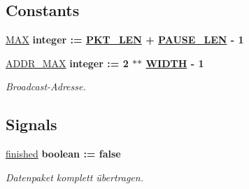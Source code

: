 \subsection*{Constants}
 \begin{DoxyCompactItemize}
\item 
\mbox{\hyperlink{classswitch_1_1switch_a138ff3d13d23e477480ce8fb57e9eab2}{M\+AX}} {\bfseries \textcolor{comment}{integer}\textcolor{vhdlchar}{ }\textcolor{vhdlchar}{ }\textcolor{vhdlchar}{\+:}\textcolor{vhdlchar}{=}\textcolor{vhdlchar}{ }\textcolor{vhdlchar}{ }\textcolor{vhdlchar}{ }\textcolor{vhdlchar}{ }{\bfseries \mbox{\hyperlink{classswitch_a9471bdd4db653e9a1f455d5147a685c2}{P\+K\+T\+\_\+\+L\+EN}}} \textcolor{vhdlchar}{+}\textcolor{vhdlchar}{ }\textcolor{vhdlchar}{ }\textcolor{vhdlchar}{ }{\bfseries \mbox{\hyperlink{classswitch_afc0c5f511c854ac6822209338935e527}{P\+A\+U\+S\+E\+\_\+\+L\+EN}}} \textcolor{vhdlchar}{-\/}\textcolor{vhdlchar}{ } \textcolor{vhdldigit}{1} \textcolor{vhdlchar}{ }} 
\item 
\mbox{\label{classswitch_1_1switch_a431fa12d262243a7ee6a374e578e9936}} 
\mbox{\hyperlink{classswitch_1_1switch_a431fa12d262243a7ee6a374e578e9936}{A\+D\+D\+R\+\_\+\+M\+AX}} {\bfseries \textcolor{comment}{integer}\textcolor{vhdlchar}{ }\textcolor{vhdlchar}{ }\textcolor{vhdlchar}{\+:}\textcolor{vhdlchar}{=}\textcolor{vhdlchar}{ }\textcolor{vhdlchar}{ } \textcolor{vhdldigit}{2} \textcolor{vhdlchar}{$\ast$}\textcolor{vhdlchar}{$\ast$}\textcolor{vhdlchar}{ }\textcolor{vhdlchar}{ }\textcolor{vhdlchar}{ }{\bfseries \mbox{\hyperlink{classswitch_ac3d29a0b6e2054c99b41ad85df850fa1}{W\+I\+D\+TH}}} \textcolor{vhdlchar}{-\/}\textcolor{vhdlchar}{ } \textcolor{vhdldigit}{1} \textcolor{vhdlchar}{ }} 
\begin{DoxyCompactList}\small\item\em Broadcast-\/\+Adresse. \end{DoxyCompactList}\end{DoxyCompactItemize}
\subsection*{Signals}
 \begin{DoxyCompactItemize}
\item 
\mbox{\label{classswitch_1_1switch_aadc756e11ce964b6d882b33148e05b0d}} 
\mbox{\hyperlink{classswitch_1_1switch_aadc756e11ce964b6d882b33148e05b0d}{finished}} {\bfseries \textcolor{comment}{boolean}\textcolor{vhdlchar}{ }\textcolor{vhdlchar}{ }\textcolor{vhdlchar}{\+:}\textcolor{vhdlchar}{=}\textcolor{vhdlchar}{ }\textcolor{vhdlchar}{ }\textcolor{vhdlchar}{ }\textcolor{vhdlchar}{ }\textcolor{vhdlchar}{false}\textcolor{vhdlchar}{ }} 
\begin{DoxyCompactList}\small\item\em Datenpaket komplett übertragen. \end{DoxyCompactList}\end{DoxyCompactItemize}
